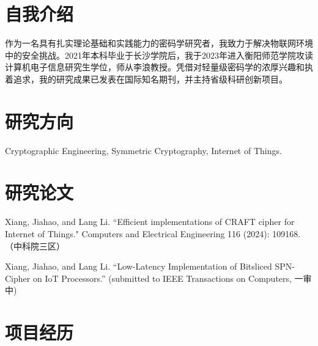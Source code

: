 \documentclass[11pt,a4paper,sans]{moderncv}
\begin{document}
\renewcommand*{\footrulewidth}{0pt}
\cfoot{}
\rfoot{\today}

\makecvtitle

\section{自我介绍}
作为一名具有扎实理论基础和实践能力的密码学研究者，我致力于解决物联网环境中的安全挑战。2021年本科毕业于长沙学院后，我于2023年进入衡阳师范学院攻读计算机电子信息研究生学位，师从李浪教授。凭借对轻量级密码学的浓厚兴趣和执着追求，我的研究成果已发表在国际知名期刊，并主持省级科研创新项目。

\section{研究方向}
Cryptographic Engineering, Symmetric Cryptography, Internet of Things.

\section{研究论文}
Xiang, Jiahao, and Lang Li. ``Efficient implementations of CRAFT cipher for Internet of Things." Computers and Electrical Engineering 116 (2024): 109168. （中科院三区）

Xiang, Jiahao, and Lang Li. ``Low-Latency Implementation of Bitsliced SPN-Cipher on IoT Processors.'' (submitted to IEEE Transactions on Computers, 一审中)

\section{项目经历}
\end{document}
